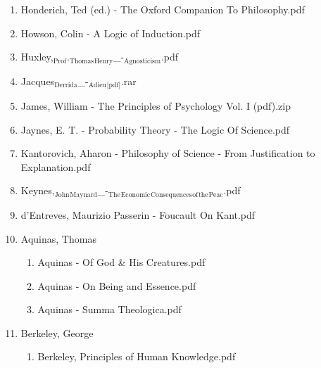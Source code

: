 \documentclass[11pt]{article}
\begin{document}
\begin{enumerate}
\begin{enumerate}
\item Honderich, Ted (ed.) - The Oxford Companion To Philosophy.pdf
\label{sec-1-1-1-1-34-25-20}

\item Howson, Colin - A Logic of Induction.pdf
\label{sec-1-1-1-1-34-25-21}

\item Huxley,$_{\text{Prof}}$.$_{\text{Thomas}}$$_{\text{Henry}}$\_-$_{\text{Agnosticism}}$.pdf
\label{sec-1-1-1-1-34-25-22}

\item Jacques$_{\text{Derrida}}$\_-$_{\text{Adieu}}$$_{\text{[pdf]}}$.rar
\label{sec-1-1-1-1-34-25-23}

\item James, William - The Principles of Psychology Vol. I (pdf).zip
\label{sec-1-1-1-1-34-25-24}

\item Jaynes, E. T. - Probability Theory - The Logic Of Science.pdf
\label{sec-1-1-1-1-34-25-25}

\item Kantorovich, Aharon - Philosophy of Science - From Justification to Explanation.pdf
\label{sec-1-1-1-1-34-25-26}

\item Keynes,$_{\text{John}}$$_{\text{Maynard}}$\_-$_{\text{The}}$$_{\text{Economic}}$$_{\text{Consequences}}$$_{\text{of}}$$_{\text{the}}$$_{\text{Peac}}$.pdf
\label{sec-1-1-1-1-34-25-27}

\item d'Entreves, Maurizio Passerin - Foucault On Kant.pdf
\label{sec-1-1-1-1-34-25-28}

\item Aquinas, Thomas
\label{sec-1-1-1-1-34-25-29}
\begin{enumerate}
\item Aquinas - Of God \& His Creatures.pdf
\label{sec-1-1-1-1-34-25-29-1}

\item Aquinas - On Being and Essence.pdf
\label{sec-1-1-1-1-34-25-29-2}

\item Aquinas - Summa Theologica.pdf
\label{sec-1-1-1-1-34-25-29-3}
\end{enumerate}

\item Berkeley, George
\label{sec-1-1-1-1-34-25-30}
\begin{enumerate}
\item Berkeley, Principles of Human Knowledge.pdf
\label{sec-1-1-1-1-34-25-30-1}


\end{enumerate}
\end{enumerate}
\end{enumerate}
\end{document}
